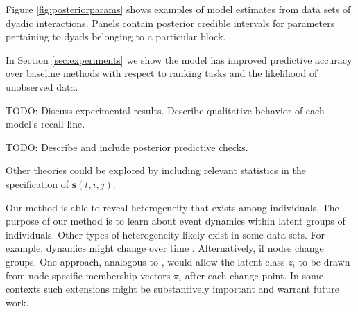 \documentclass[11pt]{article}
\begin{document}

Figure \ref{fig:posteriorparams} shows examples of model estimates from data sets of dyadic interactions. Panels contain posterior credible intervals for parameters pertaining to dyads belonging to a particular block.

In Section \ref{sec:experiments} we show the model has improved predictive accuracy over baseline methods with respect to ranking tasks and the likelihood of unobserved data.



TODO: Discuss experimental results.  Describe qualitative behavior of each model's recall line.

TODO: Describe and include posterior predictive checks.

Other theories could be explored by including relevant statistics in the specification of $\mathbf{s}(t,i,j)$.

Our method is able to reveal heterogeneity that exists among individuals.  
The purpose of our method is to learn about event dynamics within latent groups of individuals.  Other types of heterogeneity likely exist in some data sets.  For example, dynamics might change over time \cite{Vu2011}.  Alternatively, if nodes change groups.  One approach, analogous to \cite{Airoldi2008}, would allow the latent class $z_i$ to be drawn from node-specific membership vectors $\pi_i$  after each change point.  In some contexts such extensions might be substantively important and warrant future work.


\end{document}

